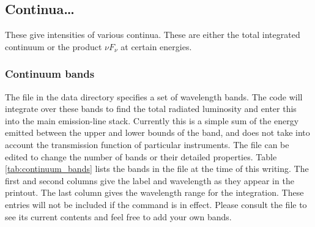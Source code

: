 \subsection{Continua\dots}

These give intensities of various continua.  These are either the total
integrated continuum or the product $\nu F_\nu$ at certain energies.

\subsubsection{Continuum bands}

The file  in the data directory
specifies a set of wavelength bands.
The code will integrate over these bands to find the
total radiated luminosity and enter this into the main emission-line stack.
Currently this is a simple sum of the energy emitted between the upper and
lower bounds of the band, and does not take into account the transmission function
of particular instruments.
The  file can be edited to change 
the number of bands or their detailed properties.
Table \ref{tab:continuum_bands} lists the bands in the file at the
time of this writing.
The first and second columns give
the label and wavelength as they appear in the printout.
The last column
gives the wavelength range for the integration.
These entries will not be included if the  command is in effect.
Please consult the file to see its current contents
and feel free to add your own bands.

